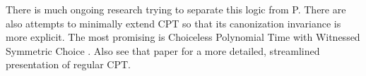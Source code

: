 

There is much ongoing research trying to separate this logic from P. There are also attempts to minimally extend CPT so that its canonization invariance is more explicit. The most promising is Choiceless Polynomial Time with Witnessed Symmetric Choice \citep{lichter2022choiceless}. Also see that paper for a more detailed, streamlined presentation of regular CPT.

